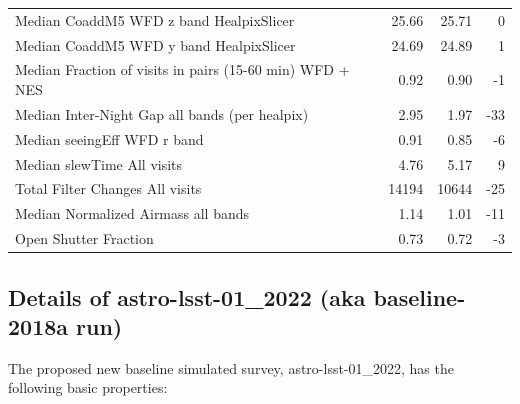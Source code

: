 \documentclass[DM,lsstdraft,authoryear,toc]{lsstdoc}
\begin{document}
\begin{table}
\begin{tabular}{lrrr}
Median CoaddM5 WFD z band HealpixSlicer            &               25.66 &               25.71 &          0 \\
Median CoaddM5 WFD y band HealpixSlicer            &               24.69 &               24.89 &          1 \\
Median Fraction of visits in pairs (15-60 min) WFD + NES &                0.92 &                0.90 &         -1 \\
Median Inter-Night Gap all bands (per healpix) &                2.95 &                1.97 &        -33 \\
Median seeingEff WFD r band                        &                0.91 &                0.85 &         -6 \\
Median slewTime All visits                         &                4.76 &                5.17 &          9 \\
Total Filter Changes All visits                    &               14194 &               10644 &        -25 \\
Median Normalized Airmass all bands                       &                1.14 &                1.01 &        -11 \\
Open Shutter Fraction                      &                0.73 &                0.72 &         -3 \\
\bottomrule
\end{tabular}
\label{tab:baseline_comparison}
\end{table}


\subsection{Details of astro-lsst-01\_2022 (aka baseline-2018a run)}

The proposed new baseline simulated survey, astro-lsst-01\_2022, has the following basic properties:
\end{document}
